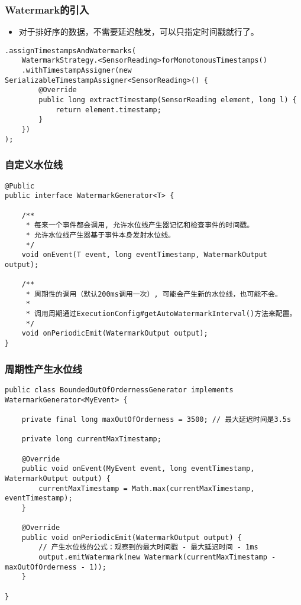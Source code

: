 \documentclass{beamer}
\begin{document}
  \begin{frame}[fragile]
      \frametitle{Watermark的引入}

      \begin{itemize}
          \item 对于排好序的数据，不需要延迟触发，可以只指定时间戳就行了。
      \end{itemize}
  
\begin{verbatim}
.assignTimestampsAndWatermarks(
    WatermarkStrategy.<SensorReading>forMonotonousTimestamps()
    .withTimestampAssigner(new SerializableTimestampAssigner<SensorReading>() {
        @Override
        public long extractTimestamp(SensorReading element, long l) {
            return element.timestamp;
        }
    })
);
\end{verbatim}
  
  \end{frame}

  \begin{frame}[fragile]
      \frametitle{自定义水位线}
  
\begin{verbatim}
@Public
public interface WatermarkGenerator<T> {

    /**
     * 每来一个事件都会调用, 允许水位线产生器记忆和检查事件的时间戳。
     * 允许水位线产生器基于事件本身发射水位线。
     */
    void onEvent(T event, long eventTimestamp, WatermarkOutput output);

    /**
     * 周期性的调用（默认200ms调用一次）, 可能会产生新的水位线，也可能不会。
     *
     * 调用周期通过ExecutionConfig#getAutoWatermarkInterval()方法来配置。
     */
    void onPeriodicEmit(WatermarkOutput output);
}
\end{verbatim}
  
  \end{frame}

  \begin{frame}[fragile]
      \frametitle{周期性产生水位线}
  
\begin{verbatim}
public class BoundedOutOfOrdernessGenerator implements WatermarkGenerator<MyEvent> {

    private final long maxOutOfOrderness = 3500; // 最大延迟时间是3.5s

    private long currentMaxTimestamp;

    @Override
    public void onEvent(MyEvent event, long eventTimestamp, WatermarkOutput output) {
        currentMaxTimestamp = Math.max(currentMaxTimestamp, eventTimestamp);
    }

    @Override
    public void onPeriodicEmit(WatermarkOutput output) {
        // 产生水位线的公式：观察到的最大时间戳 - 最大延迟时间 - 1ms
        output.emitWatermark(new Watermark(currentMaxTimestamp - maxOutOfOrderness - 1));
    }

}
\end{verbatim}
  
  \end{frame}
\end{document}

